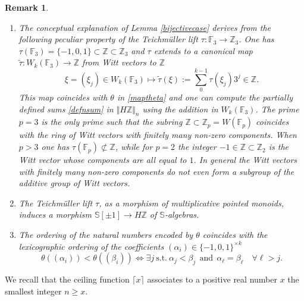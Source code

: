 \documentclass[cupthm]{CUP-JNL-JMJ}
\numberwithin{equation}{section}
\theoremstyle{cupplain}
\theoremstyle{cupdefinition}
\theoremstyle{cupremark}
\newtheorem{remark}[theorem]{Remark}
\theoremstyle{cupproof}
\def\F{{\mathbb F}}
\def\S{{\mathbb S}}
\def\Z{{\mathbb Z}}
\def\sss{{\S}}
\def\spm{{\sss[\pm 1]}}
\begin{document}
\begin{remark}\label{f3} \begin{enumerate}
\item The conceptual explanation of Lemma \ref{bijectivecase}  derives from the following peculiar property of the Teichm\"uller lift $\tau:\F_3\to \Z_3$. One has $\tau(\F_3)=\{-1,0,1\}\subset \Z\subset \Z_3$ and $\tau$ extends to a canonical map $\tilde \tau :W_k(\F_3)\to \Z$ from Witt vectors to $\Z$  
\[
\xi=(\xi_j)\in W_k(\F_3)\mapsto \tilde \tau(\xi):= \sum_0^{k-1} \tau(\xi_j) 3^j\in \Z.
\]
This map coincides with $\theta$ in \eqref{maptheta} and  one can compute the partially defined sums \eqref{defnsum} in $\Vert H\Z\Vert_n$ using the addition in $W_k(\F_3)$. The prime $p=3$ is the only prime such that the subring $\Z\subset \Z_p=W(\F_p)$ coincides with  the ring of Witt vectors with finitely many non-zero components. When $p>3$ one has $\tau(\F_p)\not\subset \Z $, while for $p=2$ the integer $-1\in \Z\subset \Z_2$ is  the Witt vector  whose components are all equal to $1$. In general the Witt vectors with finitely many non-zero components do not even form a subgroup of the additive group of Witt vectors.
\item The Teichm\"uller lift $\tau$, as a morphism of multiplicative pointed monoids, induces a morphism $\spm\to H\Z$ of $\sss$-algebras.
\item The ordering of the natural numbers encoded by  $\theta$ coincides with the  lexicographic ordering of the coefficients  $(\alpha_i)\in\{-1,0,1\}^{\times k}$ \[ \theta((\alpha_i))< \theta((\beta_i))\iff \exists j ~\text{s.t.}~\alpha_j<\beta_j~~\text{and}~~ \alpha_\ell=\beta_\ell \quad \forall \ell>j.
\]
\end{enumerate}
\end{remark}


We recall that the ceiling function $\lceil x\rceil$ associates to a positive real number $x$ the smallest integer $n\geq x$.
\end{document}
